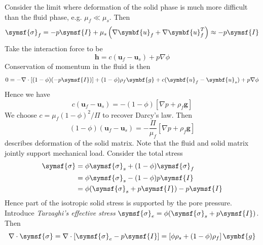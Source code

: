 \documentclass{jknotes}
\renewcommand{\u}{\symbf{u}}
\begin{document}
Consider the limit where deformation of the solid phase is much more difficult
than the fluid phase, e.g. $\mu_f \ll \mu_s$. Then
\begin{equation}
	\symsf{\sigma}_f = -p\symsf{I} + \mu_s \left(\nabla \u_f + \nabla
	\u_f^T\right) \approx -p\symsf{I}
\end{equation}
Take the interaction force to be
\begin{equation}
	\symbf{h} = c(\u_f - \u_s)+p\nabla \phi
\end{equation}
Conservation of momentum in the fluid is then
\begin{equation}
	0 = -\nabla \cdot \left[ (1-\phi)(-p\symsf{I})\right] + (1-\phi) \rho_f
	\symbf{g} + c(\u_f - \u_s) + p\nabla \phi
\end{equation}
Hence we have
\begin{equation}
	c(\u_f - \u_s) = -(1-\phi)\left[\nabla p + \rho_f \symbf{g}\right]
\end{equation}
We choose $c = \mu_f(1-\phi)^2/\Pi$ to recover Darcy's law. Then
\begin{equation}
	(1-\phi) (\u_f - \u_s) = -\frac{\Pi}{\mu_f}\left[\nabla p + \rho_f
	\symbf{g}\right]
	\label{eq:darcy}
\end{equation}
describes deformation of the solid matrix. Note that the fluid and solid
matrix jointly support mechanical load. Consider the total stress
\begin{align}
	\symsf{\sigma} &= \phi \symsf{\sigma}_s + (1-\phi)\symsf{\sigma}_f \\
				   &= \phi \symsf{\sigma}_s - (1-\phi)p \symsf{I} \\
				   &= \phi(\symsf{\sigma}_s + p\symsf{I}) - p \symsf{I}
\end{align}
Hence part of the isotropic solid stress is supported by the pore pressure.
Introduce \emph{Tarzaghi's effective stress} $\symsf{\sigma}_e =
\phi(\symsf{\sigma}_s + p\symsf{I})$.  Then
\begin{equation}
	\nabla \cdot \symsf{\sigma} = \nabla \cdot \left[\symsf{\sigma}_e
	-p\symsf{I}\right] = \left[\phi \rho_s + (1-\phi)\rho_f\right] \symbf{g}
\end{equation}
\end{document}
